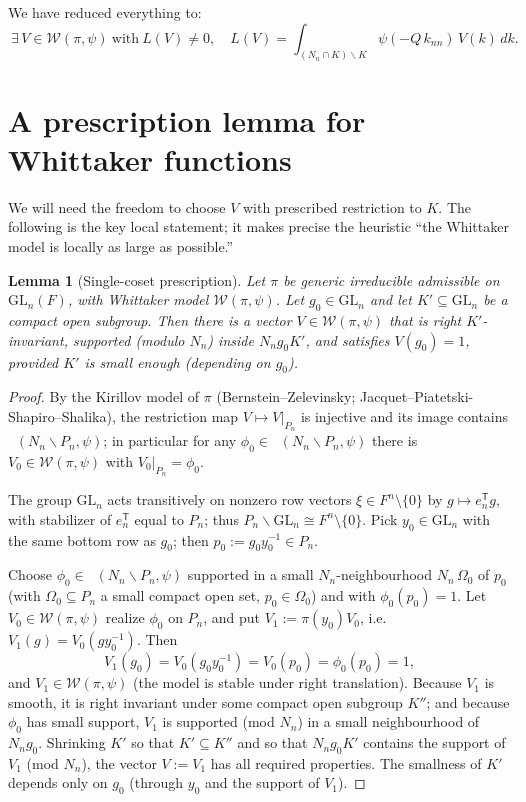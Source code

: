 \documentclass[12pt]{article}
\newcommand{\GL}{\mathrm{GL}}
\newcommand{\Wmod}{\mathcal{W}}
\DeclareMathOperator{\Cc}{C_c^\infty}
\newtheorem{lemma}{Lemma}
\begin{document}
We have reduced everything to:
\begin{equation}\label{eq:goal}
  \boxed{\ \exists\,V\in\Wmod(\pi,\psi)\ \text{with}\ L(V)\neq0,\quad
  L(V)=\int_{(N_n\cap K)\backslash K}\psi(-Q\,k_{nn})\,V(k)\,dk.\ }
\end{equation}

\section{A prescription lemma for Whittaker functions}

We will need the freedom to choose $V$ with prescribed restriction to $K$. The
following is the key local statement; it makes precise the heuristic ``the
Whittaker model is locally as large as possible.''

\begin{lemma}[Single-coset prescription]\label{lem:single}
Let $\pi$ be generic irreducible admissible on $\GL_n(F)$, with Whittaker model
$\Wmod(\pi,\psi)$. Let $g_0\in\GL_n$ and let $K'\subseteq\GL_n$ be a compact open
subgroup. Then there is a vector $V\in\Wmod(\pi,\psi)$ that is right $K'$-invariant,
supported (modulo $N_n$) inside $N_n g_0 K'$, and satisfies $V(g_0)=1$, provided
$K'$ is small enough (depending on $g_0$).
\end{lemma}

\begin{proof}
By the Kirillov model of $\pi$ (Bernstein--Zelevinsky; Jacquet--Piatetski-Shapiro--Shalika),
the restriction map $V\mapsto V|_{P_n}$ is injective and its image contains
$\Cc(N_n\backslash P_n,\psi)$; in particular for any $\phi_0\in\Cc(N_n\backslash
P_n,\psi)$ there is $V_0\in\Wmod(\pi,\psi)$ with $V_0|_{P_n}=\phi_0$.

The group $\GL_n$ acts transitively on nonzero row vectors $\xi\in F^n\setminus\{0\}$
by $g\mapsto e_n^{\mathsf T}g$, with stabilizer of $e_n^{\mathsf T}$ equal to $P_n$;
thus $P_n\backslash\GL_n\cong F^n\setminus\{0\}$. Pick $y_0\in\GL_n$ with the same
bottom row as $g_0$; then $p_0:=g_0 y_0^{-1}\in P_n$.

Choose $\phi_0\in\Cc(N_n\backslash P_n,\psi)$ supported in a small $N_n$-neighbourhood
$N_n\,\Omega_0$ of $p_0$ (with $\Omega_0\subseteq P_n$ a small compact open set,
$p_0\in\Omega_0$) and with $\phi_0(p_0)=1$. Let $V_0\in\Wmod(\pi,\psi)$ realize
$\phi_0$ on $P_n$, and put $V_1:=\pi(y_0)V_0$, i.e.\ $V_1(g)=V_0(gy_0^{-1})$. Then
\[
  V_1(g_0)=V_0(g_0 y_0^{-1})=V_0(p_0)=\phi_0(p_0)=1,
\]
and $V_1\in\Wmod(\pi,\psi)$ (the model is stable under right translation). Because
$V_1$ is smooth, it is right invariant under some compact open subgroup $K''$; and
because $\phi_0$ has small support, $V_1$ is supported (mod $N_n$) in a small
neighbourhood of $N_n g_0$. Shrinking $K'$ so that $K'\subseteq K''$ and so that
$N_n g_0 K'$ contains the support of $V_1$ (mod $N_n$), the vector $V:=V_1$ has all
required properties. The smallness of $K'$ depends only on $g_0$ (through $y_0$ and
the support of $V_1$). 
\end{proof}
\end{document}
